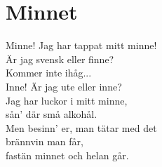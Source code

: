 \section{Minnet}
Minne! Jag har tappat mitt minne!\\
Är jag svensk eller finne?\\
Kommer inte ihåg...\\
Inne! Är jag ute eller inne?\\
Jag har luckor i mitt minne,\\
sån' där små alkohål.\\
Men besinn' er, man tätar med det\\
brännvin man får,\\
fastän minnet och helan går.\\